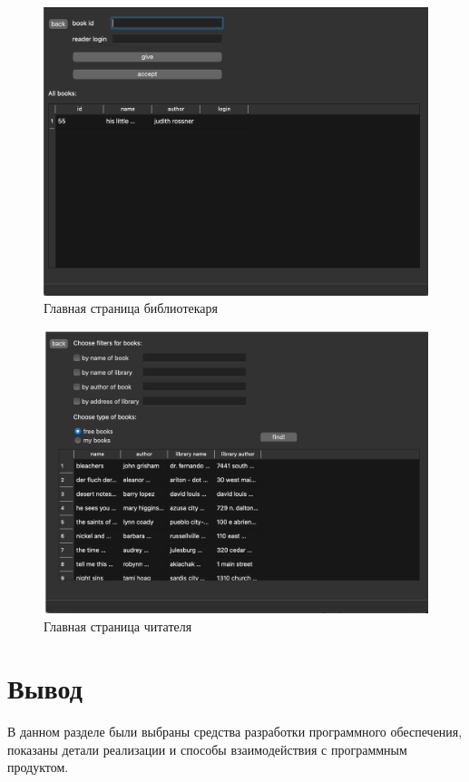 \newpage
\begin{figure}[h!]
	\begin{center}
		\includegraphics[width = \linewidth]{img/main_librarian.png}
	\end{center}
	\captionsetup{justification=centering}
	\caption{Главная страница библиотекаря}
	\label{img:mainlibrarian}
\end{figure}
\newpage
\begin{figure}[h!]
	\begin{center}
		\includegraphics[width = \linewidth]{img/main_reader.png}
	\end{center}
	\captionsetup{justification=centering}
	\caption{Главная страница читателя}
	\label{img:mainreader}
\end{figure}


\section*{Вывод}
В данном разделе были выбраны средства разработки программного обеспечения, показаны детали реализации и способы взаимодействия с программным продуктом.